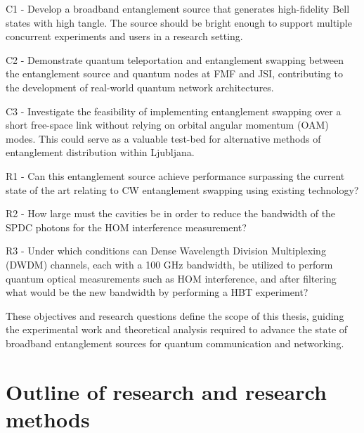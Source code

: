 \documentclass{article}
\theoremstyle{mytheoremstyle}
\theoremstyle{mytheoremstyle}
\theoremstyle{myproblemstyle}
\begin{document}

C1 - Develop a broadband entanglement source that generates high-fidelity Bell states with high tangle.
The source should be bright enough to support multiple concurrent experiments and users in a research setting.

C2 - Demonstrate quantum teleportation and entanglement swapping between the entanglement source and quantum nodes at FMF and JSI,
contributing to the development of real-world quantum network architectures.


C3 - Investigate the feasibility of implementing entanglement swapping over a short free-space link without relying on orbital angular momentum (OAM) modes.
This could serve as a valuable test-bed for alternative methods of entanglement distribution within Ljubljana.

R1 - Can this entanglement source achieve performance surpassing the current state of the art relating to CW entanglement swapping using existing technology?

R2 - How large must the cavities be in order to reduce the bandwidth of the SPDC photons for the HOM interference measurement?

R3 - Under which conditions can Dense Wavelength Division Multiplexing (DWDM) channels, each with a 100 GHz bandwidth,
be utilized to perform quantum optical measurements such as HOM interference, and after filtering what would be the
new bandwidth by performing a HBT experiment?

These objectives and research questions define the scope of this thesis,
guiding the experimental work and theoretical analysis required to advance the state of broadband entanglement sources for quantum communication and networking.
\section{Outline of research and research methods}
\end{document}
